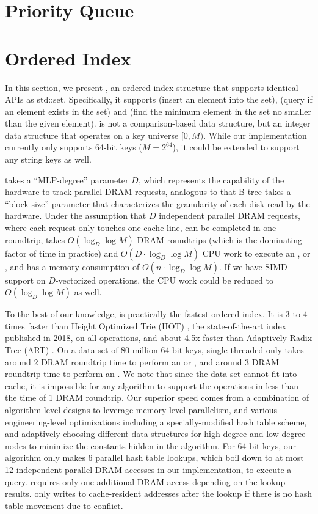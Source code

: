 \documentclass[11pt, usletter]{article}
\begin{document}
\section{Priority Queue} \label{priorityqueue}

\section{Ordered Index} \label{orderedindex}

In this section, we present \MlpIndex, an ordered index structure that supports identical APIs as std::set.
Specifically, it supports \insertion (insert an element into the set), \lookup (query if an element exists in the set) 
and \lowerbound (find the minimum element in the set no smaller than the given element).
\MlpIndex is not a comparison-based data structure, but an integer data structure that operates on a key universe $[0,M)$.
While our implementation currently only supports 64-bit keys ($M=2^{64}$), it could be extended to support any string keys as well.

\MlpIndex takes a ``MLP-degree'' parameter $D$, 
which represents the capability of the hardware to track parallel DRAM requests, 
analogous to that B-tree takes a ``block size'' parameter that characterizes the granularity of each disk read by the hardware.
Under the assumption that $D$ independent parallel DRAM requests, where each request only touches one cache line, can be completed in one roundtrip,
\MlpIndex takes $O(\log_D\log M)$ DRAM roundtrips (which is the dominating factor of time in practice) 
and $O(D\cdot\log_D\log M)$ CPU work to execute an \insertion, \lookup or \lowerbound,
and has a memory consumption of $O(n\cdot \log_D\log M)$.
If we have SIMD support on $D$-vectorized operations, the CPU work could be reduced to $O(\log_D\log M)$ as well.

To the best of our knowledge, \MlpIndex is practically the fastest ordered index. 
It is 3 to 4 times faster than Height Optimized Trie (HOT) \cite{hot_sigmod18}, 
the state-of-the-art index published in 2018, on all operations,
and about 4.5x faster than Adaptively Radix Tree (ART) \cite{arttrie_icde13}. 
On a data set of 80 million 64-bit keys, single-threaded \MlpIndex only takes around 2 DRAM roundtrip time to perform 
an \insertion or \lookup, and around 3 DRAM roundtrip time to perform an \lowerbound.
We note that since the data set cannot fit into cache, 
it is impossible for any algorithm to support the operations in less than the time of 1 DRAM roundtrip.
Our superior speed 
comes from a combination of algorithm-level designs to leverage memory level parallelism, 
and various engineering-level optimizations including a specially-modified hash table scheme, 
and adaptively choosing different data structures for high-degree and low-degree nodes 
to minimize the constants hidden in the algorithm.
For 64-bit keys, our algorithm only makes 6 parallel hash table lookups, 
which boil down to at most 12 independent parallel DRAM accesses in our implementation,
to execute a \lookup query. \lowerbound requires only one additional DRAM access
depending on the lookup results. 
\insertion only writes to cache-resident addresses after the lookup 
if there is no hash table movement due to conflict.
\end{document}
